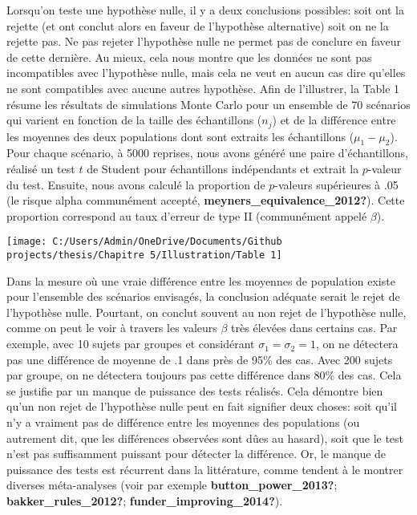 \documentclass[
  english,
  man]{apa6}
\begin{document}
Lorsqu'on teste une hypothèse nulle, il y a deux conclusions possibles: soit ont la rejette (et ont conclut alors en faveur de l'hypothèse alternative) soit on ne la rejette pas. Ne pas rejeter l'hypothèse nulle ne permet pas de conclure en faveur de cette dernière. Au mieux, cela nous montre que les données ne sont pas incompatibles avec l'hypothèse nulle, mais cela ne veut en aucun cas dire qu'elles ne sont compatibles avec aucune autres hypothèse. Afin de l'illustrer, la Table 1 résume les résultats de simulations Monte Carlo pour un ensemble de 70 scénarios qui varient en fonction de la taille des échantillons (\(n_j\)) et de la différence entre les moyennes des deux populations dont sont extraits les échantillons (\(\mu_1-\mu_2\)). Pour chaque scénario, à 5000 reprises, nous avons généré une paire d'échantillons, réalisé un test \(t\) de Student pour échantillons indépendants et extrait la \(p\)-valeur du test. Ensuite, nous avons calculé la proportion de \(p\)-valeurs supérieures à .05 (le risque alpha communément accepté, \textbf{meyners\_equivalence\_2012?}). Cette proportion correspond au taux d'erreur de type II (communément appelé \(\beta\)).

\begin{center}\texttt{[image: C:/Users/Admin/OneDrive/Documents/Github projects/thesis/Chapitre 5/Illustration/Table 1]} \end{center}

Dans la mesure où une vraie différence entre les moyennes de population existe pour l'ensemble des scénarios envisagés, la conclusion adéquate serait le rejet de l'hypothèse nulle. Pourtant, on conclut souvent au non rejet de l'hypothèse nulle, comme on peut le voir à travers les valeurs \(\beta\) très élevées dans certains cas. Par exemple, avec 10 sujets par groupes et considérant \(\sigma_1=\sigma_2=1\), on ne détectera pas une différence de moyenne de .1 dans près de 95\% des cas. Avec 200 sujets par groupe, on ne détectera toujours pas cette différence dans 80\% des cas. Cela se justifie par un manque de puissance des tests réalisés. Cela démontre bien qu'un non rejet de l'hypothèse nulle peut en fait signifier deux choses: soit qu'il n'y a vraiment pas de différence entre les moyennes des populations (ou autrement dit, que les différences observées sont dûes au hasard), soit que le test n'est pas suffisamment puissant pour détecter la différence. Or, le manque de puissance des tests est récurrent dans la littérature, comme tendent à le montrer diverses méta-analyses (voir par exemple \textbf{button\_power\_2013?}; \textbf{bakker\_rules\_2012?}; \textbf{funder\_improving\_2014?}).
\end{document}
